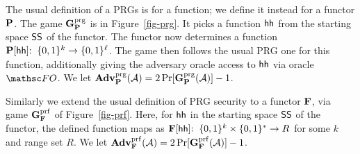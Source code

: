  The usual definition  of a PRGs is for a function; we define it instead for a functor $\mathbf{P}$. The game $\mathbf{G}^{\mathrm{prg}}_{\mathbf{P}}$ is in Figure~\ref{fig-prg}. It picks a function $\mathsf{hh}$ from the starting space $\mathsf{SS}$ of the functor. The functor now determines a function $\mathbf{P}[\mathsf{hh}]{:\;\;}\{0,1\}^k\to\{0,1\}^{\ell}$. The game then follows the usual PRG one for this function, additionally giving the adversary oracle access to $\mathsf{hh}$ via oracle $\HASH$. We let $\mathbf{Adv}^{\mathrm{prg}}_{\mathbf{P}}(\mathcal{A}) = 2\Pr[\mathbf{G}^{\mathrm{prg}}_{\mathbf{P}}(\mathcal{A})]-1$.

Similarly we extend the usual definition of PRG security to a functor $\mathbf{F}$, via game $\mathbf{G}^{\mathrm{prf}}_{\mathbf{F}}$ of Figure~\ref{fig-prf}. Here, for $\mathsf{hh}$ in the starting space $\mathsf{SS}$ of the functor, the defined function maps as $\mathbf{F}[\mathsf{hh}]{:\;\;}\{0,1\}^k\times\{0,1\}^*\to R$ for some $k$ and range set $R$. We let $\mathbf{Adv}^{\mathrm{prf}}_{\mathbf{F}}(\mathcal{A}) = 2\Pr[\mathbf{G}^{\mathrm{prf}}_{\mathbf{F}}(\mathcal{A})]-1$.





